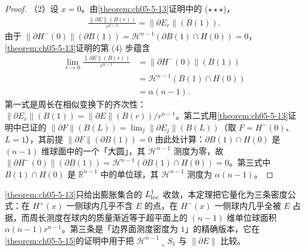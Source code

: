 \documentclass[../../main.tex]{subfiles}%
\begin{document}
\begin{proof}
（2）设 $x=0$。由\cref{theorem:ch05-5-13}证明中的 ($\star\star\star$)，%
\begin{align*}
\frac{\lVert\partial E\rVert(B(r))}{r^{n-1}}=\lVert\partial E_r\rVert(B(1)).
\end{align*}
由于 $\lVert\partial H^-(0)\rVert(\partial B(1))=\mathcal{H}^{n-1}(\partial B(1)\cap H(0))=0$，\cref{theorem:ch05-5-13}证明的第 (4) 步蕴含%
\begin{align*}
\lim_{r\to0}\frac{\lVert\partial E\rVert(B(r))}{r^{n-1}}
&=\lVert\partial H^-(0)\rVert(B(1))\\
&=\mathcal{H}^{n-1}(B(1)\cap H(0))\\
&=\alpha(n-1).
\end{align*}
第一式是周长在相似变换下的齐次性：$\lVert\partial E_r\rVert(B(1))=\lVert\partial E\rVert(B(r))/r^{n-1}$。第二式用\cref{theorem:ch05-5-13}证明中已证的 $\lVert\partial F\rVert(B(L))=\lim_j\lVert\partial E_j\rVert(B(L))$（取 $F=H^-(0)$、$L=1$），其前提 $\lVert\partial F\rVert(\partial B(1))=0$ 由此处计算：$\partial B(1)\cap H(0)$ 是 $(n-1)$ 维球面中的一个「大圆」，其 $\mathcal{H}^{n-1}$ 测度为零，故 $\lVert\partial H^-(0)\rVert(\partial B(1))=\mathcal{H}^{n-1}(\partial B(1)\cap H(0))=0$。第三式中 $B(1)\cap H(0)$ 是 $\mathbb{R}^{n-1}$ 中的单位球，其 $\mathcal{H}^{n-1}$ 测度为 $\alpha(n-1)$。%
\end{proof}

\begin{remark}\label{remark:ch05-def-5-6-动机}
\cref{theorem:ch05-5-13}只给出膨胀集合的 $L^1_{\mathrm{loc}}$ 收敛，本定理把它量化为三条密度公式：在 $H^+(x)$ 一侧球内几乎不含 $E$ 的点，在 $H^-(x)$ 一侧球内几乎全被 $E$ 占据，而周长测度在球内的质量渐近等于超平面上的 $(n-1)$ 维单位球面积 $\alpha(n-1)r^{n-1}$。第三条是「边界面测度密度为 $1$」的精确版本，它在\cref{theorem:ch05-5-15}的证明中用于把 $\mathcal{H}^{n-1}\llcorner S_1$ 与 $\lVert\partial E\rVert$ 比较。%
\end{remark}
\end{document}
